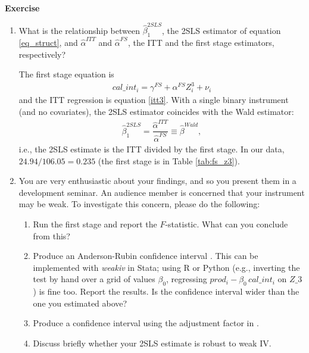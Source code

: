 \documentclass[10pt]{article}
\newcounter{exercise}
\newenvironment{exercise}%
{%
	\refstepcounter{exercise}%
	\textbf{Exercise \theexercise}%
	}%
{
 \par\vspace{\baselineskip}%
\noindent\ignorespacesafterend
}
\begin{document}
\begin{exercise}
\begin{enumerate}
		\color{red}
		Table \ref{tab:iv} shows the 2SLS estimate. The coefficient is 0.235 (SE 0.0662) and highly significant: for compliers, one additional unit of caloric intake raises productivity by 0.235 units. The conventional 95\% confidence interval is $[0.106, 0.365]$.

		
		\color{black}
		\item What is the relationship between $ \hat{\beta}_{1}^{2SLS} $, the 2SLS estimator of equation \ref{eq_struct}, and $ \hat{\alpha}^{ITT} $ and $ \hat{\alpha}^{FS} $, the ITT and the first stage estimators, respectively?

		\color{red}
		The first stage equation is
		\begin{align}\label{fs3}
		cal\_int_{i} = \gamma^{FS} + \alpha^{FS} Z^{3}_i + \nu_{i}
		\end{align}
		and the ITT regression is equation \ref{itt3}. With a single binary instrument (and no covariates), the 2SLS estimator coincides with the Wald estimator:
		\begin{align*}
		 \hat{\beta}_1^{2SLS} = \dfrac{\hat{\alpha}^{ITT}}{\hat{\alpha}^{FS}} \equiv \hat{\beta}^{Wald},
		\end{align*}
		i.e., the 2SLS estimate is the ITT divided by the first stage. In our data, $24.94/106.05 = 0.235$ (the first stage is in Table \ref{tab:fs_z3}).
		\color{black}
		\item You are very enthusiastic about your findings, and so you present them in a development seminar. An audience member is concerned that your instrument may be weak. To investigate this concern, please do the following:
		\begin{enumerate}
			\item Run the first stage and report the $F$-statistic. What can you conclude from this?
			\item Produce an Anderson-Rubin confidence interval \citep{anderson1949}. This can be implemented with \textit{weakiv} in Stata; using R or Python (e.g., inverting the test by hand over a grid of values $\beta_0$, regressing $prod_i - \beta_0\, cal\_int_i$ on $Z\_3$) is fine too. Report the results. Is the confidence interval wider than the one you estimated above?
			\item Produce a confidence interval using the adjustment factor in \citet{lee2022}.
			\item Discuss briefly whether your 2SLS estimate is robust to weak IV.
		\end{enumerate}


\end{enumerate}
\end{exercise}
\end{document}

